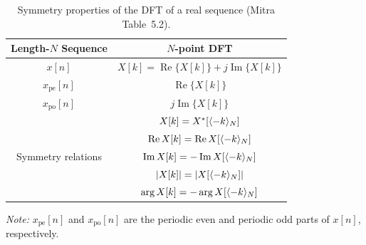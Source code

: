 \begin{table}[H]
\centering
\caption{Symmetry properties of the DFT of a real sequence (Mitra Table~5.2).}
\label{tab:dft-real-symmetry}

\begin{tabular}{cc}
\toprule
\textbf{Length-$N$ Sequence} & \textbf{$N$-point DFT} \\
\midrule
$x[n]$ & $X[k]=\operatorname{Re}\{X[k]\}+j\operatorname{Im}\{X[k]\}$ \\
\midrule
$x_{\mathrm{pe}}[n]$ & $\operatorname{Re}\{X[k]\}$ \\
$x_{\mathrm{po}}[n]$ & $j\operatorname{Im}\{X[k]\}$ \\
\midrule
\multirow{5}{*}{Symmetry relations}
& $X[k]=X^{*}[\langle -k\rangle_{N}]$ \\[0.6em]
& $\operatorname{Re}X[k]=\operatorname{Re}X[\langle -k\rangle_{N}]$ \\[0.6em]
& $\operatorname{Im}X[k]=-\operatorname{Im}X[\langle -k\rangle_{N}]$ \\[0.6em]
& $\lvert X[k]\rvert=\lvert X[\langle -k\rangle_{N}]\rvert$ \\[0.6em]
& $\arg X[k]=-\arg X[\langle -k\rangle_{N}]$ \\
\bottomrule
\end{tabular}

\medskip

\parbox{0.9\textwidth}{
\textit{Note:}
$x_{\mathrm{pe}}[n]$ and $x_{\mathrm{po}}[n]$ are the periodic even and
periodic odd parts of $x[n]$, respectively.
}
\end{table}

